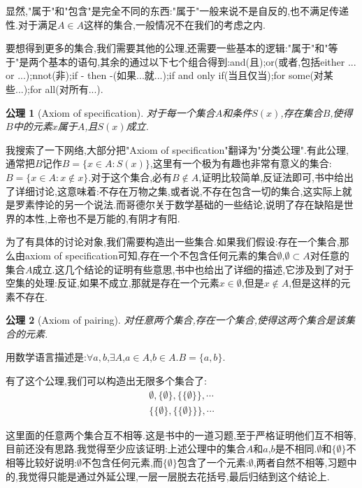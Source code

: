 \documentclass[12pt,a4paper,openany]{book}
\newtheorem{axiom}{公理}[section]
\begin{document}
显然,"属于"和"包含"是完全不同的东西:"属于"一般来说不是自反的,也不满足传递性.对于满足$A \in A$这样的集合,一般情况不在我们的考虑之内.

要想得到更多的集合,我们需要其他的公理,还需要一些基本的逻辑:"属于"和"等于"是两个基本的语句,其余的通过以下七个组合得到:and(且);or(或者,包括either ... or ...);nnot(非);if - then -(如果...就...);if and only if(当且仅当);for some(对某些...);for all(对所有...).

\begin{axiom}[Axiom of specification]
对于每一个集合$A$和条件$S(x)$,存在集合$B$,使得$B$中的元素$x$属于$A$,且$S(x)$成立.
\end{axiom}

我搜索了一下网络,大部分把"Axiom of specification"翻译为"分类公理".有此公理,通常把$B$记作$B=\{x \in A: S(x)\}$,这里有一个极为有趣也非常有意义的集合:$B=\{x \in A: x \notin x\}$.对于这个集合,必有$B \notin A$,证明比较简单,反证法即可,书中给出了详细讨论,这意味着:不存在万物之集,或者说,不存在包含一切的集合,这实际上就是罗素悖论的另一个说法.而哥德尔关于数学基础的一些结论,说明了存在缺陷是世界的本性,上帝也不是万能的,有阴才有阳.

为了有具体的讨论对象,我们需要构造出一些集合.如果我们假设:存在一个集合,那么由axiom of specification可知,存在一个不包含任何元素的集合$\emptyset$,$\emptyset \subset A$对任意的集合$A$成立.这几个结论的证明有些意思,书中也给出了详细的描述,它涉及到了对于空集的处理:反证,如果不成立,那就是存在一个元素$x \in \emptyset$,但是$x \notin A$,但是这样的元素不存在.

\begin{axiom}[Axiom of pairing]
对任意两个集合,存在一个集合,使得这两个集合是该集合的元素.
\end{axiom}

用数学语言描述是:$\forall a,b$,$\exists A$,$a \in A$,$b \in A$.$B=\{a,b\}$.

有了这个公理,我们可以构造出无限多个集合了:
\begin{gather*}
\emptyset,\{\emptyset\},\{\{\emptyset\}\},\cdots\\
\{\{\emptyset\},\{\{\emptyset\}\}\},\cdots
\end{gather*}

这里面的任意两个集合互不相等.这是书中的一道习题,至于严格证明他们互不相等,目前还没有思路.我觉得至少应该证明:上述公理中的集合$A$和$a$,$b$是不相同.$\emptyset$和$\{\emptyset\}$不相等比较好说明:$\emptyset$不包含任何元素,而$\{\emptyset\}$包含了一个元素:$\emptyset$,两者自然不相等,习题中的,我觉得只能是通过外延公理,一层一层脱去花括号,最后归结到这个结论上.
\end{document}
